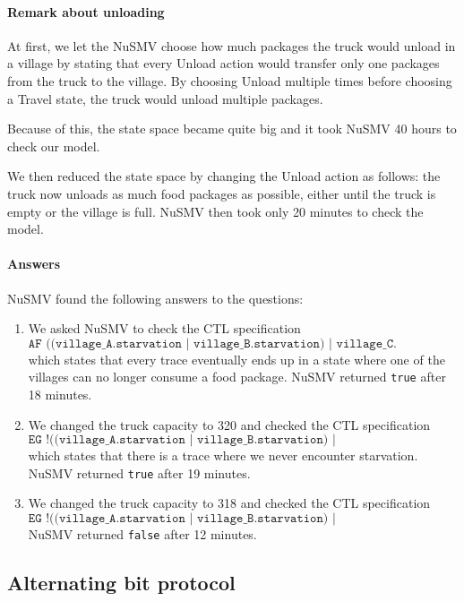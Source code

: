 \documentclass[12pt]{article}
\begin{document}
\paragraph{Remark about unloading} At first, we let the NuSMV choose how much packages the truck would unload in a village by stating that every Unload action would transfer only one packages from the truck to the village. By choosing Unload multiple times before choosing a Travel state, the truck would unload multiple packages.

Because of this, the state space became quite big and it took NuSMV 40 hours to check our model.

We then reduced the state space by changing the Unload action as follows: the truck now unloads as much food packages as possible, either until the truck is empty or the village is full. NuSMV then took only 20 minutes to check the model.

\paragraph{Answers} NuSMV found the following answers to the questions:
\begin{enumerate}
\item We asked NuSMV to check the CTL specification
\[ \texttt{AF ((village\_A.starvation | village\_B.starvation) | village\_C.
starvation)} \]
which states that every trace eventually ends up in a state where one of the villages can no longer consume a food package.
NuSMV returned \texttt{true} after 18 minutes.

\item We changed the truck capacity to 320 and checked the CTL specification
\[ \texttt{EG !((village\_A.starvation | village\_B.starvation) | village\_C.starvation)} \]
which states that there is a trace where we never encounter starvation.
NuSMV returned \texttt{true} after 19 minutes.

\item We changed the truck capacity to 318 and checked the CTL specification
\[\texttt{EG !((village\_A.starvation | village\_B.starvation) | village\_C.starvation)} \]
NuSMV returned \texttt{false} after 12 minutes.
\end{enumerate}

\clearpage

\subsection*{Alternating bit protocol}
\end{document}
